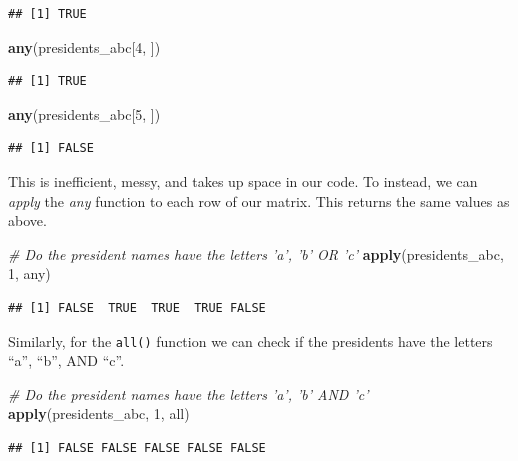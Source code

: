 \documentclass[
]{book}
\newenvironment{Shaded}{\begin{snugshade}}{\end{snugshade}}
\newcommand{\CommentTok}[1]{\textcolor[rgb]{0.56,0.35,0.01}{\textit{#1}}}
\newcommand{\DecValTok}[1]{\textcolor[rgb]{0.00,0.00,0.81}{#1}}
\newcommand{\KeywordTok}[1]{\textcolor[rgb]{0.13,0.29,0.53}{\textbf{#1}}}
\newcommand{\NormalTok}[1]{#1}
\begin{document}
\begin{verbatim}
## [1] TRUE
\end{verbatim}

\begin{Shaded}
\begin{Highlighting}[]
\KeywordTok{any}\NormalTok{(presidents_abc[}\DecValTok{4}\NormalTok{, ])}
\end{Highlighting}
\end{Shaded}

\begin{verbatim}
## [1] TRUE
\end{verbatim}

\begin{Shaded}
\begin{Highlighting}[]
\KeywordTok{any}\NormalTok{(presidents_abc[}\DecValTok{5}\NormalTok{, ])}
\end{Highlighting}
\end{Shaded}

\begin{verbatim}
## [1] FALSE
\end{verbatim}

This is inefficient, messy, and takes up space in our code. To instead, we can \emph{apply} the \emph{any} function to each row of our matrix. This returns the same values as above.

\begin{Shaded}
\begin{Highlighting}[]
\CommentTok{# Do the president names have the letters 'a', 'b' OR 'c'}
\KeywordTok{apply}\NormalTok{(presidents_abc, }\DecValTok{1}\NormalTok{, any)}
\end{Highlighting}
\end{Shaded}

\begin{verbatim}
## [1] FALSE  TRUE  TRUE  TRUE FALSE
\end{verbatim}

Similarly, for the \texttt{all()} function we can check if the presidents have the letters ``a'', ``b'', AND ``c''.

\begin{Shaded}
\begin{Highlighting}[]
\CommentTok{# Do the president names have the letters 'a', 'b' AND 'c'}
\KeywordTok{apply}\NormalTok{(presidents_abc, }\DecValTok{1}\NormalTok{, all)}
\end{Highlighting}
\end{Shaded}

\begin{verbatim}
## [1] FALSE FALSE FALSE FALSE FALSE
\end{verbatim}
\end{document}
